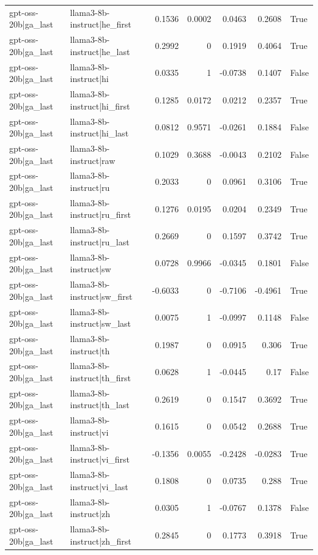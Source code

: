 \begin{table}
\begin{tabular}{l l r r r r l}
gpt-oss-20b|ga_last & llama3-8b-instruct|he_first & 0.1536 & 0.0002 & 0.0463 & 0.2608 & True \\
gpt-oss-20b|ga_last & llama3-8b-instruct|he_last & 0.2992 & 0 & 0.1919 & 0.4064 & True \\
gpt-oss-20b|ga_last & llama3-8b-instruct|hi & 0.0335 & 1 & -0.0738 & 0.1407 & False \\
gpt-oss-20b|ga_last & llama3-8b-instruct|hi_first & 0.1285 & 0.0172 & 0.0212 & 0.2357 & True \\
gpt-oss-20b|ga_last & llama3-8b-instruct|hi_last & 0.0812 & 0.9571 & -0.0261 & 0.1884 & False \\
gpt-oss-20b|ga_last & llama3-8b-instruct|raw & 0.1029 & 0.3688 & -0.0043 & 0.2102 & False \\
gpt-oss-20b|ga_last & llama3-8b-instruct|ru & 0.2033 & 0 & 0.0961 & 0.3106 & True \\
gpt-oss-20b|ga_last & llama3-8b-instruct|ru_first & 0.1276 & 0.0195 & 0.0204 & 0.2349 & True \\
gpt-oss-20b|ga_last & llama3-8b-instruct|ru_last & 0.2669 & 0 & 0.1597 & 0.3742 & True \\
gpt-oss-20b|ga_last & llama3-8b-instruct|sw & 0.0728 & 0.9966 & -0.0345 & 0.1801 & False \\
gpt-oss-20b|ga_last & llama3-8b-instruct|sw_first & -0.6033 & 0 & -0.7106 & -0.4961 & True \\
gpt-oss-20b|ga_last & llama3-8b-instruct|sw_last & 0.0075 & 1 & -0.0997 & 0.1148 & False \\
gpt-oss-20b|ga_last & llama3-8b-instruct|th & 0.1987 & 0 & 0.0915 & 0.306 & True \\
gpt-oss-20b|ga_last & llama3-8b-instruct|th_first & 0.0628 & 1 & -0.0445 & 0.17 & False \\
gpt-oss-20b|ga_last & llama3-8b-instruct|th_last & 0.2619 & 0 & 0.1547 & 0.3692 & True \\
gpt-oss-20b|ga_last & llama3-8b-instruct|vi & 0.1615 & 0 & 0.0542 & 0.2688 & True \\
gpt-oss-20b|ga_last & llama3-8b-instruct|vi_first & -0.1356 & 0.0055 & -0.2428 & -0.0283 & True \\
gpt-oss-20b|ga_last & llama3-8b-instruct|vi_last & 0.1808 & 0 & 0.0735 & 0.288 & True \\
gpt-oss-20b|ga_last & llama3-8b-instruct|zh & 0.0305 & 1 & -0.0767 & 0.1378 & False \\
gpt-oss-20b|ga_last & llama3-8b-instruct|zh_first & 0.2845 & 0 & 0.1773 & 0.3918 & True \\

\end{tabular}
\end{table}
